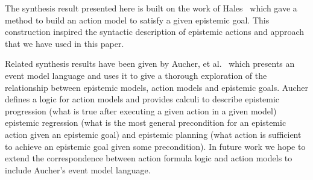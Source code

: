 The synthesis result presented here is built on the work of Hales~\cite{hales:2013} which gave a method to build an action model to satisfy a given epistemic goal.
This construction inspired the syntactic description of epistemic actions and approach that we have used in this paper.

Related synthesis results have been given by Aucher, et al.~\cite{aucher:2011,aucher:2012,aucher:2013} which presents an event model language and uses it to give a thorough exploration of the relationship between epistemic models, action models and epistemic goals.
Aucher defines a logic for action models and provides calculi to describe epistemic progression (what is true after executing a given action in a given model) epistemic regression (what is the most general precondition for an epistemic action given an epistemic goal) and epistemic planning (what action is sufficient to achieve an epistemic goal given some precondition).
In future work we hope to extend the correspondence between action formula logic and action models to include Aucher's event model language.
